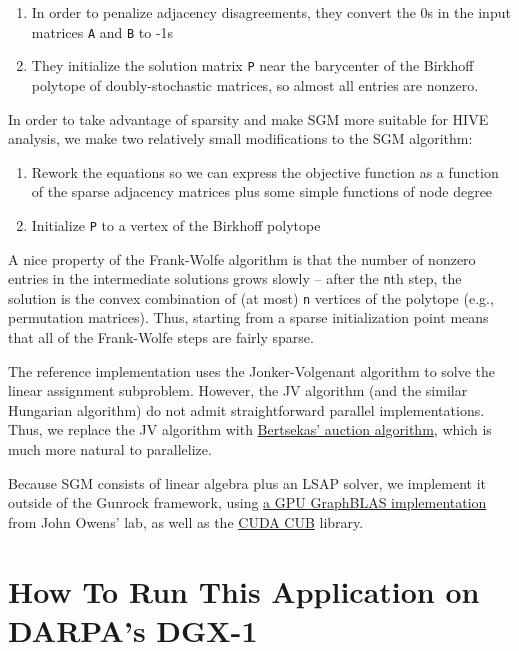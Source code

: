 \documentclass[10pt,oneside]{memoir}
\providecommand{\tightlist}{%
  \setlength{\itemsep}{0pt}\setlength{\parskip}{0pt}}
\begin{document}
\begin{enumerate}
\def\labelenumi{\arabic{enumi}.}
\tightlist
\item
  In order to penalize adjacency disagreements, they convert the 0s in
  the input matrices \texttt{A} and \texttt{B} to -1s
\item
  They initialize the solution matrix \texttt{P} near the barycenter of
  the Birkhoff polytope of doubly-stochastic matrices, so almost all
  entries are nonzero.
\end{enumerate}

In order to take advantage of sparsity and make SGM more suitable for
HIVE analysis, we make two relatively small modifications to the SGM
algorithm:

\begin{enumerate}
\def\labelenumi{\arabic{enumi}.}
\tightlist
\item
  Rework the equations so we can express the objective function as a
  function of the sparse adjacency matrices plus some simple functions
  of node degree
\item
  Initialize \texttt{P} to a vertex of the Birkhoff polytope
\end{enumerate}

A nice property of the Frank-Wolfe algorithm is that the number of
nonzero entries in the intermediate solutions grows slowly -- after the
\texttt{n}th step, the solution is the convex combination of (at most)
\texttt{n} vertices of the polytope (e.g., permutation matrices). Thus,
starting from a sparse initialization point means that all of the
Frank-Wolfe steps are fairly sparse.

The reference implementation uses the Jonker-Volgenant algorithm to
solve the linear assignment subproblem. However, the JV algorithm (and
the similar Hungarian algorithm) do not admit straightforward parallel
implementations. Thus, we replace the JV algorithm with
\href{http://web.mit.edu/dimitrib/www/Auction_Encycl.pdf}{Bertsekas'
auction algorithm}, which is much more natural to parallelize.

Because SGM consists of linear algebra plus an LSAP solver, we implement
it outside of the Gunrock framework, using
\href{https://arxiv.org/abs/1804.03327}{a GPU GraphBLAS implementation}
from John Owens' lab, as well as the
\href{https://nvlabs.github.io/cub/}{CUDA CUB} library.

\hypertarget{how-to-run-this-application-on-darpas-dgx-1-7}{%
\section{How To Run This Application on DARPA's
DGX-1}\label{how-to-run-this-application-on-darpas-dgx-1-7}}
\end{document}
